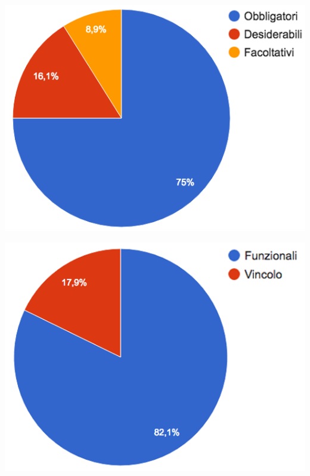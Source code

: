\begin{minipage}{\textwidth}
	\begin{minipage}[b]{0.49\textwidth}
		\centering
		\includegraphics[scale=0.35]{../immagini/chart_requisiti_importanza}
	\end{minipage}
	\hfill
	\begin{minipage}[b]{0.49\textwidth}
		\centering
		\includegraphics[scale=0.35]{../immagini/chart_requisiti_tipo}
	\end{minipage}
\end{minipage}
